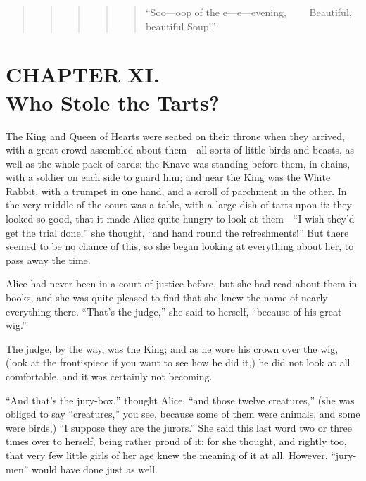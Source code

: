 \documentclass[11pt,openany,oneside]{book}
\begin{document}
\begin{quote}
\begin{quote}
\begin{quote}
\begin{quote}
\begin{quote}
{\small “Soo—oop of the e—e—evening,}\newline
{\small  ~~~~Beautiful, beautiful Soup!” }

\end{quote}
\end{quote}
\end{quote}
\end{quote}
\end{quote}


\clearpage{}
{}
\chapter*{CHAPTER XI.\\  Who Stole the Tarts?}
\leavevmode\hypertarget{d14.fp173712}{}The King and Queen of Hearts were seated on their throne when they arrived, with a great crowd assembled about them—all sorts of little birds and beasts, as well as the whole pack of cards: the Knave was standing before them, in chains, with a soldier on each side to guard him; and near the King was the White Rabbit, with a trumpet in one hand, and a scroll of parchment in the other. In the very middle of the court was a table, with a large dish of tarts upon it: they looked so good, that it made Alice quite hungry to look at them—“I wish they’d get the trial done,” she thought, “and hand round the refreshments!” But there seemed to be no chance of this, so she began looking at everything about her, to pass away the time. 

Alice had never been in a court of justice before, but she had read about them in books, and she was quite pleased to find that she knew the name of nearly everything there. “That’s the judge,” she said to herself, “because of his great wig.” 

The judge, by the way, was the King; and as he wore his crown over the wig, (look at the frontispiece if you want to see how he did it,) he did not look at all comfortable, and it was certainly not becoming. 

“And that’s the jury-box,” thought Alice, “and those twelve creatures,” (she was obliged to say “creatures,” you see, because some of them were animals, and some were birds,) “I suppose they are the jurors.” She said this last word two or three times over to herself, being rather proud of it: for she thought, and rightly too, that very few little girls of her age knew the meaning of it at all. However, “jury-men” would have done just as well. 
\end{document}
